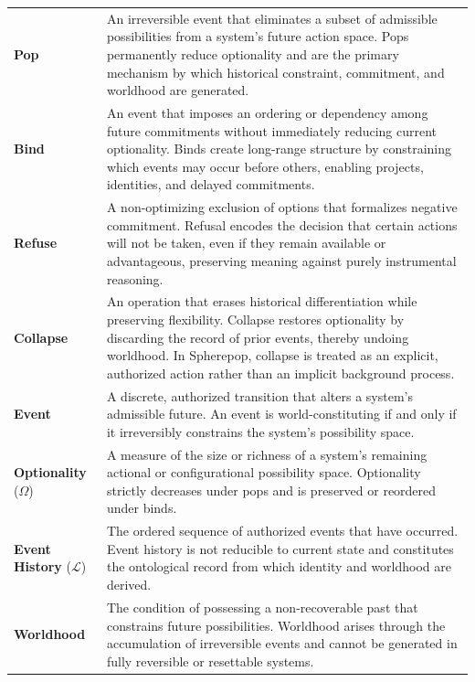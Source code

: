 \documentclass[11pt]{article}
\begin{document}
\begin{longtable}{p{3.5cm} p{10.5cm}}

\textbf{Pop} &
An irreversible event that eliminates a subset of admissible possibilities from a system’s future action space. Pops permanently reduce optionality and are the primary mechanism by which historical constraint, commitment, and worldhood are generated. \\[8pt]

\textbf{Bind} &
An event that imposes an ordering or dependency among future commitments without immediately reducing current optionality. Binds create long-range structure by constraining which events may occur before others, enabling projects, identities, and delayed commitments. \\[8pt]

\textbf{Refuse} &
A non-optimizing exclusion of options that formalizes negative commitment. Refusal encodes the decision that certain actions will not be taken, even if they remain available or advantageous, preserving meaning against purely instrumental reasoning. \\[8pt]

\textbf{Collapse} &
An operation that erases historical differentiation while preserving flexibility. Collapse restores optionality by discarding the record of prior events, thereby undoing worldhood. In Spherepop, collapse is treated as an explicit, authorized action rather than an implicit background process. \\[10pt]

\textbf{Event} &
A discrete, authorized transition that alters a system’s admissible future. An event is world-constituting if and only if it irreversibly constrains the system’s possibility space. \\[8pt]

\textbf{Optionality} ($\Omega$) &
A measure of the size or richness of a system’s remaining actional or configurational possibility space. Optionality strictly decreases under pops and is preserved or reordered under binds. \\[8pt]

\textbf{Event History} ($\mathcal{L}$) &
The ordered sequence of authorized events that have occurred. Event history is not reducible to current state and constitutes the ontological record from which identity and worldhood are derived. \\[8pt]

\textbf{Worldhood} &
The condition of possessing a non-recoverable past that constrains future possibilities. Worldhood arises through the accumulation of irreversible events and cannot be generated in fully reversible or resettable systems. \\[8pt]


\end{longtable}
\end{document}
